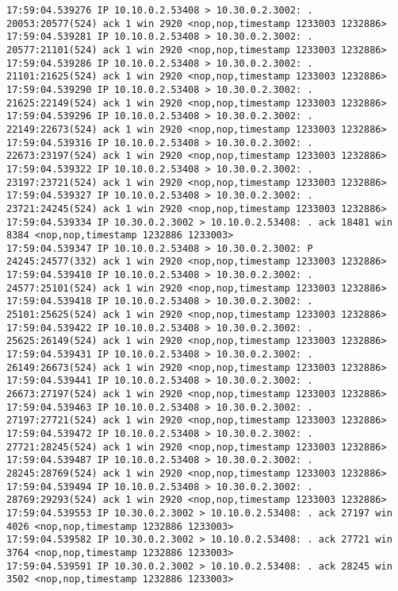 \documentclass[a4paper,12pt]{article}
\begin{document}
\begin{Verbatim}
17:59:04.539276 IP 10.10.0.2.53408 > 10.30.0.2.3002: . 20053:20577(524) ack 1 win 2920 <nop,nop,timestamp 1233003 1232886>
17:59:04.539281 IP 10.10.0.2.53408 > 10.30.0.2.3002: . 20577:21101(524) ack 1 win 2920 <nop,nop,timestamp 1233003 1232886>
17:59:04.539286 IP 10.10.0.2.53408 > 10.30.0.2.3002: . 21101:21625(524) ack 1 win 2920 <nop,nop,timestamp 1233003 1232886>
17:59:04.539290 IP 10.10.0.2.53408 > 10.30.0.2.3002: . 21625:22149(524) ack 1 win 2920 <nop,nop,timestamp 1233003 1232886>
17:59:04.539296 IP 10.10.0.2.53408 > 10.30.0.2.3002: . 22149:22673(524) ack 1 win 2920 <nop,nop,timestamp 1233003 1232886>
17:59:04.539316 IP 10.10.0.2.53408 > 10.30.0.2.3002: . 22673:23197(524) ack 1 win 2920 <nop,nop,timestamp 1233003 1232886>
17:59:04.539322 IP 10.10.0.2.53408 > 10.30.0.2.3002: . 23197:23721(524) ack 1 win 2920 <nop,nop,timestamp 1233003 1232886>
17:59:04.539327 IP 10.10.0.2.53408 > 10.30.0.2.3002: . 23721:24245(524) ack 1 win 2920 <nop,nop,timestamp 1233003 1232886>
17:59:04.539334 IP 10.30.0.2.3002 > 10.10.0.2.53408: . ack 18481 win 8384 <nop,nop,timestamp 1232886 1233003>
17:59:04.539347 IP 10.10.0.2.53408 > 10.30.0.2.3002: P 24245:24577(332) ack 1 win 2920 <nop,nop,timestamp 1233003 1232886>
17:59:04.539410 IP 10.10.0.2.53408 > 10.30.0.2.3002: . 24577:25101(524) ack 1 win 2920 <nop,nop,timestamp 1233003 1232886>
17:59:04.539418 IP 10.10.0.2.53408 > 10.30.0.2.3002: . 25101:25625(524) ack 1 win 2920 <nop,nop,timestamp 1233003 1232886>
17:59:04.539422 IP 10.10.0.2.53408 > 10.30.0.2.3002: . 25625:26149(524) ack 1 win 2920 <nop,nop,timestamp 1233003 1232886>
17:59:04.539431 IP 10.10.0.2.53408 > 10.30.0.2.3002: . 26149:26673(524) ack 1 win 2920 <nop,nop,timestamp 1233003 1232886>
17:59:04.539441 IP 10.10.0.2.53408 > 10.30.0.2.3002: . 26673:27197(524) ack 1 win 2920 <nop,nop,timestamp 1233003 1232886>
17:59:04.539463 IP 10.10.0.2.53408 > 10.30.0.2.3002: . 27197:27721(524) ack 1 win 2920 <nop,nop,timestamp 1233003 1232886>
17:59:04.539472 IP 10.10.0.2.53408 > 10.30.0.2.3002: . 27721:28245(524) ack 1 win 2920 <nop,nop,timestamp 1233003 1232886>
17:59:04.539487 IP 10.10.0.2.53408 > 10.30.0.2.3002: . 28245:28769(524) ack 1 win 2920 <nop,nop,timestamp 1233003 1232886>
17:59:04.539494 IP 10.10.0.2.53408 > 10.30.0.2.3002: . 28769:29293(524) ack 1 win 2920 <nop,nop,timestamp 1233003 1232886>
17:59:04.539553 IP 10.30.0.2.3002 > 10.10.0.2.53408: . ack 27197 win 4026 <nop,nop,timestamp 1232886 1233003>
17:59:04.539582 IP 10.30.0.2.3002 > 10.10.0.2.53408: . ack 27721 win 3764 <nop,nop,timestamp 1232886 1233003>
17:59:04.539591 IP 10.30.0.2.3002 > 10.10.0.2.53408: . ack 28245 win 3502 <nop,nop,timestamp 1232886 1233003>

\end{Verbatim}
\end{document}
